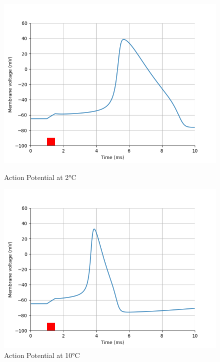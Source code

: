 \documentclass{article}
\begin{document}
    \begin{figure}[htbp]
        \centering
        \begin{minipage}[b]{0.49\textwidth}
            \includegraphics[width=\textwidth]{ac_at_2degree.png}
            \caption{Action Potential at 2°C}
            \label{fig:ac_at_2degree}
        \end{minipage}
        \hfill
        \begin{minipage}[b]{0.49\textwidth}
            \includegraphics[width=\textwidth]{ac_at_10degree.png}
            \caption{Action Potential at 10°C}
            \label{fig:ac_at_10degree}
        \end{minipage}
    \end{figure}
\end{document}
